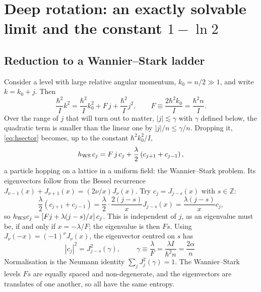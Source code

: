 \documentclass[preprint,12pt]{elsarticle}
\begin{document}
\section{Deep rotation: an exactly solvable limit and the constant $1-\ln2$}
\label{sec:rotation}

\subsection{Reduction to a Wannier--Stark ladder}

Consider a level with large relative angular momentum, $k_{0}=n/2\gg1$, and
write $k=k_{0}+j$. Then
\begin{equation}
\frac{\hbar^{2}}{I}k^{2}=\frac{\hbar^{2}}{I}k_{0}^{2}+F\,j+\frac{\hbar^{2}}{I}j^{2},
\qquad F\equiv\frac{2\hbar^{2}k_{0}}{I}=\frac{\hbar^{2}n}{I}.
\end{equation}
Over the range of $j$ that will turn out to matter, $|j|\lesssim\gamma$ with
$\gamma$ defined below, the quadratic term is smaller than the linear one by
$|j|/n\le\gamma/n$. Dropping it, \eqref{eq:hsector} becomes, up to the constant
$\hbar^{2}k_{0}^{2}/I$,
\begin{equation}
h_{\rm WS}\,c_{j}=F\,j\,c_{j}+\frac{\lambda}{2}\left(c_{j+1}+c_{j-1}\right),
\label{eq:WS}
\end{equation}
a particle hopping on a lattice in a uniform field: the Wannier--Stark problem.
Its eigenvectors follow from the Bessel recurrence
$J_{\nu-1}(x)+J_{\nu+1}(x)=(2\nu/x)J_{\nu}(x)$. Try $c_{j}=J_{j-s}(x)$ with
$s\in\mathbb{Z}$:
\begin{equation}
\frac{\lambda}{2}\left(c_{j+1}+c_{j-1}\right)
=\frac{\lambda}{2}\cdot\frac{2(j-s)}{x}J_{j-s}(x)=\frac{\lambda(j-s)}{x}c_{j},
\end{equation}
so $h_{\rm WS}c_{j}=\left[Fj+\lambda(j-s)/x\right]c_{j}$. This is independent of
$j$, as an eigenvalue must be, if and only if $x=-\lambda/F$; the eigenvalue is
then $Fs$. Using $J_{\nu}(-x)=(-1)^{\nu}J_{\nu}(x)$, the eigenvector centred on
$s$ has
\begin{equation}
|c_{j}|^{2}=J_{j-s}^{2}(\gamma),\qquad
\boxed{\;\gamma\equiv\frac{\lambda}{F}=\frac{\lambda I}{\hbar^{2}n}
=\frac{2\alpha}{n}\;}
\label{eq:bessel}
\end{equation}
Normalisation is the Neumann identity $\sum_{j}J_{j}^{2}(\gamma)=1$. The
Wannier--Stark levels $Fs$ are equally spaced and non-degenerate, and the
eigenvectors are translates of one another, so all have the same entropy.
\end{document}
